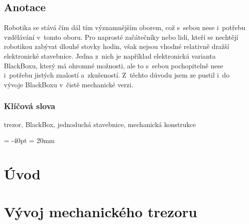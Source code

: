 \documentclass{template/priloha}
\author{Tomáš Vavrinec} %
\begin{document}
\maketitle

\pagestyle{empty}

\section*{Anotace}
\color{black}

Robotika se stává čím dál tím významnějším oborem, což s~sebou nese i~potřebu vzdělávání v~tomto oboru.
Pro naprosté začátečníky nebo lidi, kteří se nechtějí robotikou zabývat dlouhé stovky hodin, však nejsou vhodné 
relativně dražší elektronické stavebnice. Jedna z~nich je například elektronická varianta BlackBoxu, který má ohromné možnosti, 
ale to s~sebou pochopitelně nese i~potřebu jistých znalostí a~zkušeností.
Z~těchto důvodu jsem ze pustil i~do vývoje BlackBoxu v~čistě mechanické verzi.

\subsection*{Klíčová slova}

\color{black}

trezor, BlackBox, jednoduchá stavebnice, mechanická konstrukce %

\newpage

\newpage

\tableofcontents %

\voffset = -40pt
\headsep = 20mm

\newpage

\setcounter{figure}{0}
\setcounter{table}{0}

\pagestyle{fancy}

\chapter{Úvod}
\thispagestyle{fancy}


\chapter{Vývoj mechanického trezoru}
\thispagestyle{fancy}
\label{M-vyvoj}




\end{document}

